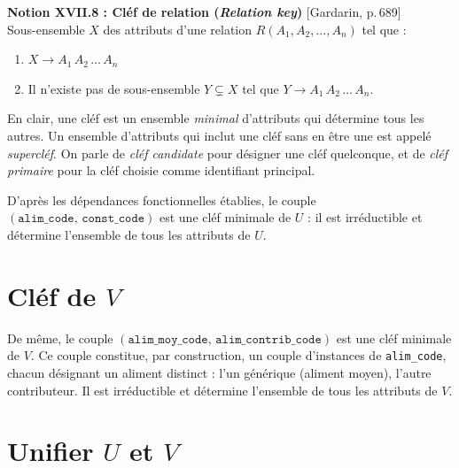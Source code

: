 \documentclass[12pt, a4paper]{article}
\newcommand{\attr}[1]{\texttt{#1}}
\newcommand{\citeg}[1]{\textnormal{\footnotesize[#1]}}
\begin{document}
    \begin{rappelbox}
        \textbf{Notion XVII.8 : Cléf de relation (\textit{Relation key})}
        \hfill\citeg{Gardarin, p.\,689}\\[0.5em]
        Sous-ensemble $X$ des attributs d'une relation $R(A_1, A_2, \ldots, A_n)$ tel que :
        \begin{enumerate}
            \item $X \rightarrow A_1\, A_2\, \ldots\, A_n$
            \item Il n'existe pas de sous-ensemble $Y \subsetneq X$ tel que $Y \rightarrow A_1\, A_2\, \ldots\, A_n$.
        \end{enumerate}
        En clair, une cléf est un ensemble \emph{minimal} d'attributs qui détermine tous les autres.
        Un ensemble d'attributs qui inclut une cléf sans en être une est appelé \emph{supercléf}. On parle
        de \emph{cléf candidate} pour désigner une cléf quelconque, et de \emph{cléf primaire} pour la cléf
        choisie comme identifiant principal.
    \end{rappelbox}

    D'après les dépendances fonctionnelles établies, le couple $(\attr{alim\_code},\, \attr{const\_code})$
    est une cléf minimale de $U$ : il est irréductible et détermine l'ensemble de tous les attributs de $U$.



    \section{Cléf de \texorpdfstring{$V$}{V}}

    De même, le couple $(\attr{alim\_moy\_code},\, \attr{alim\_contrib\_code})$ est une cléf minimale de
    $V$. Ce couple constitue, par construction, un couple d'instances de \attr{alim\_code}, chacun
    désignant un aliment distinct : l'un générique (aliment moyen), l'autre contributeur. Il est
    irréductible et détermine l'ensemble de tous les attributs de $V$.



    \section{Unifier \texorpdfstring{$U$}{U} et \texorpdfstring{$V$}{V}}
    \label{sec:unifier}
\end{document}
